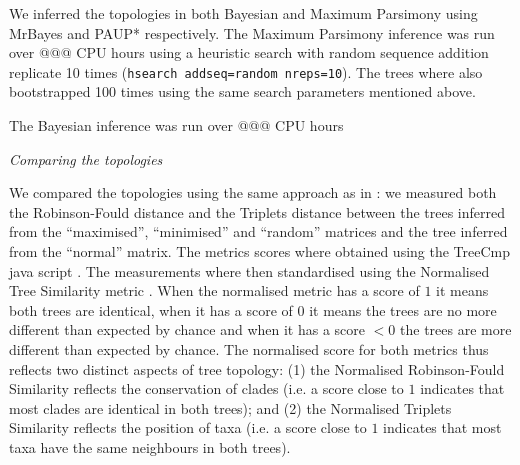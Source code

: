 \documentclass[12pt,letterpaper]{article}
\renewcommand{\subsection}[1]{%
\bigskip
\begin{center}
\begin{large}
\normalfont\itshape #1
\end{large}
\end{center}}
\begin{document}
We inferred the topologies in both Bayesian and Maximum Parsimony using MrBayes \citep[v3.2.6;][]{Ronquist2012mrbayes} and PAUP* \citep[v4.0a151;][]{swofford2001paup} respectively.
The Maximum Parsimony inference was run over @@@ CPU hours using a heuristic search with random sequence addition replicate 10 times (\texttt{hsearch addseq=random nreps=10}).
The trees where also bootstrapped 100 times using the same search parameters mentioned above.

The Bayesian inference was run over @@@ CPU hours



\subsection{Comparing the topologies}

We compared the topologies using the same approach as in \cite{Guillerme2016146}: we measured both the Robinson-Fould distance \citep{RF1981} and the Triplets distance \citep{dobson1975triplets} between the trees inferred from the ``maximised'', ``minimised'' and ``random'' matrices and the tree inferred from the ``normal'' matrix.
The metrics scores where obtained using the TreeCmp java script \citep{Bogdanowicz2012}.
The measurements where then standardised using the Normalised Tree Similarity metric \citep[i.e. centering the metrics scores using the mean metric score for 1000 pairwise comparisons between random trees with $n$ taxa;][]{Bogdanowicz2012,Guillerme2016146}.
When the normalised metric has a score of $1$ it means both trees are identical, when it has a score of $0$ it means the trees are no more different than expected by chance and when it has a score $<0$ the trees are more different than expected by chance.
The normalised score for both metrics thus reflects two distinct aspects of tree topology: (1) the Normalised Robinson-Fould Similarity reflects the conservation of clades (i.e. a score close to $1$ indicates that most clades are identical in both trees); and (2) the Normalised Triplets Similarity reflects the position of taxa (i.e. a score close to $1$ indicates that most taxa have the same neighbours in both trees).
\end{document}
